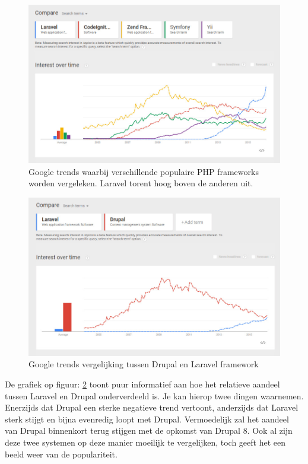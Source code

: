 \begin{figure}[!ht]
 \includegraphics[width=120mm]{img/googletrends2.jpg}
 \centering
 \caption{Google trends waarbij verschillende populaire PHP frameworks worden vergeleken. Laravel torent hoog boven de anderen uit.}
  \label{fig:googletrends Laravel 2}
\end{figure}

\pagebreak

\begin{figure}[!ht]
  \includegraphics[width=\textwidth]{img/googletrends3.jpg}
   \centering
  \caption{Google trends vergelijking tussen Drupal en Laravel framework}
  \label{fig:googletrends Drupal 7 versus Laravel}
\end{figure}

\noindent
De grafiek op figuur: \ref{fig:googletrends Drupal 7 versus Laravel} toont puur informatief aan hoe het relatieve aandeel tussen Laravel en Drupal onderverdeeld is. Je kan hierop twee dingen waarnemen. Enerzijds dat Drupal een sterke negatieve trend vertoont, anderzijds dat Laravel sterk stijgt en bijna evenredig loopt met Drupal. Vermoedelijk zal het aandeel van Drupal binnenkort terug stijgen met de opkomst van Drupal 8. Ook al zijn deze twee systemen op deze manier moeilijk te vergelijken, toch geeft het een beeld weer van de populariteit.

